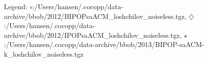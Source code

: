 Legend: {\color{NavyBlue}$\circ$}:/Users/hansen/.cocopp/data-archive/bbob/2012/BIPOPsaACM\_loshchilov\_noiseless.tgz, {\color{Magenta}$\diamondsuit$}:/Users/hansen/.cocopp/data-archive/bbob/2012/IPOPsaACM\_loshchilov\_noiseless.tgz, {\color{Orange}$\star$}:/Users/hansen/.cocopp/data-archive/bbob/2013/BIPOP-saACM-k\_loshchilov\_noiseless.tgz
